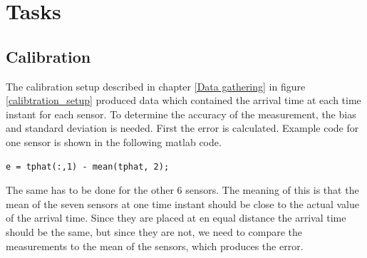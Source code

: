 \documentclass[10pt,a4paper]{report}
\begin{document}
\newpage
\chapter{Tasks}
\label{Tasks}

\newpage
\section{Calibration}
\label{Calibration}
The calibration setup described in chapter \ref{Data gathering} in figure \ref{calibtration_setup} produced data which contained the arrival time at each time instant for each sensor. To determine the accuracy of the measurement, the bias and standard deviation is needed. First the error is calculated. Example code for one sensor is shown in the following matlab code. 
\begin{verbatim}
e = tphat(:,1) - mean(tphat, 2);
\end{verbatim}
The same has to be done for the other 6 sensors. The meaning of this is that the mean of the seven sensors at one time instant should be close to the actual value of the arrival time. Since they are placed at en equal distance the arrival time should be the same, but since they are not, we need to compare the measurements to the mean of the sensors, which produces the error.
\end{document}
